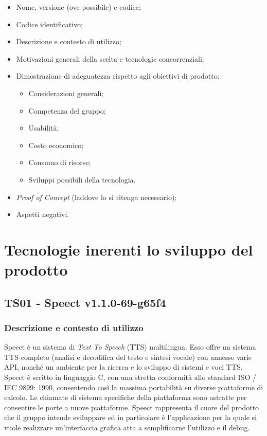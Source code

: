 \documentclass[./../Technology Baseline.tex]{subfiles}
\begin{document}
\begin{itemize}
	\item Nome, versione (ove possibile) e codice;
	\item Codice identificativo;
	\item Descrizione e contesto di utilizzo;
	\item Motivazioni generali della scelta e tecnologie concorrenziali;
	\item Dimostrazione di adeguatezza rispetto agli obiettivi di prodotto:
	\begin{itemize}
		\item Considerazioni generali;
		\item Competenza del gruppo;
		\item Usabilità;
		\item Costo economico;
		\item Consumo di risorse;
		\item Sviluppi possibili della tecnologia.
	\end{itemize}
	\item \textit{Proof of Concept} (laddove lo si ritenga necessario);
	\item Aspetti negativi.
\end{itemize}

\section{Tecnologie inerenti lo sviluppo del prodotto}

\subsection{TS01 - Speect v1.1.0-69-g65f4}

\subsubsection{Descrizione e contesto di utilizzo}

Speect è un sistema di \textit{Text To Speech} (TTS) multilingua. Esso offre un sistema TTS completo (analisi e decodifica del testo e sintesi vocale) con annesse varie API, nonché un ambiente per la ricerca e lo sviluppo di sistemi e voci TTS. Speect è scritto in linguaggio C, con una stretta conformità allo standard ISO / IEC 9899: 1990, consentendo così la massima portabilità su diverse piattaforme di calcolo. Le chiamate di sistema specifiche della piattaforma sono astratte per consentire le porte a nuove piattaforme. Speect rappresenta il cuore del prodotto che il gruppo intende sviluppare ed in particolare è l'applicazione per la quale si vuole realizzare un'interfaccia grafica atta a semplificarne l'utilizzo e il debug.
\end{document}

